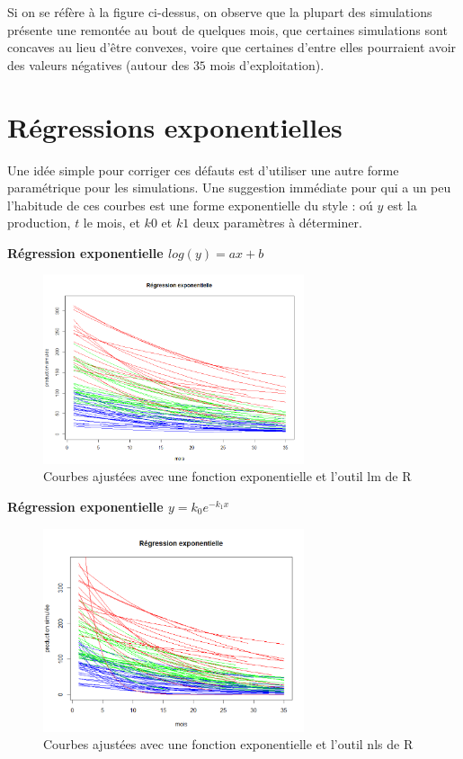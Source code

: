 \documentclass[12pt]{article}
\begin{document}
Si on se r\'ef\`ere \`a la figure ci-dessus, on observe que la plupart des simulations
pr\'esente une remont\'ee au bout de quelques mois, que certaines simulations sont concaves
au lieu d'\^etre convexes, voire que certaines d'entre elles pourraient avoir des valeurs n\'egatives (autour des $35$ mois d'exploitation).

\newpage


\section{R\'egressions exponentielles}

Une id\'ee simple pour corriger ces d\'efauts est d'utiliser une autre forme param\'etrique pour
les simulations. Une suggestion imm\'ediate pour qui a un peu l'habitude de ces courbes est
une forme exponentielle du style : o\'u $y$ est la production, $t$ le mois, et $k0$ et
$k1$ deux param\`etres \`a d\'eterminer.

\textbf{R\'egression exponentielle $log(y)=ax+b$}

\begin{figure}[H]
 \centering %
	\includegraphics[width=290px]{reg_exp_1}
  \caption{\label{fig:exponential_reg_lm} Courbes ajust\'ees avec une fonction exponentielle et l'outil lm de R}
\end{figure}


\textbf{R\'egression exponentielle $y=k_{0}e^{-k_{1}x}$}

\begin{figure}[H]
 \centering %
	\includegraphics[width=290px]{reg_exp_2}
  \caption{\label{fig:exponential_reg_nls} Courbes ajust\'ees avec une fonction exponentielle et l'outil nls de R}
\end{figure}
\end{document}
